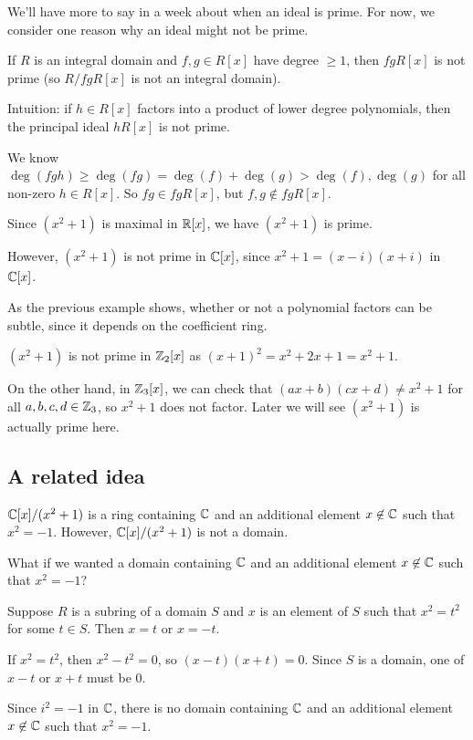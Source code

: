 \documentclass[12pt,letterpaper]{report}
\begin{document}
We'll have more to say in a week about when an ideal is prime.
For now, we consider one reason why an ideal might not be prime.

\begin{lem}{}{}
  If $R$ is an integral domain and $f, g \in R[x]$ have degree $\geq 1$, then $fgR[x]$ is not prime
  (so $R/fgR[x]$ is not an integral domain).
\end{lem}

Intuition: if $h \in R[x]$ factors into a product of lower degree polynomials, then the principal
ideal $hR[x]$ is not prime.

\begin{thmproof}
  We know $\deg(fgh) \geq \deg(fg) = \deg(f) + \deg(g) > \deg(f), \deg(g)$ for all non-zero
  $h \in R[x]$.
  So $fg \in fgR[x]$, but $f, g \not\in fgR[x]$.
\end{thmproof}

\begin{ex}
  Since $(x^2 + 1)$ is maximal in $\mathbb{R}[x]$, we have $(x^2 + 1)$ is prime.

  However, $(x^2 + 1)$ is not prime in $\mathbb{C}[x]$, since $x^2 + 1 = (x - i)(x + i)$ in $\mathbb{C}[x]$.
\end{ex}

As the previous example shows, whether or not a polynomial factors can be subtle, since it depends
on the coefficient ring.

\begin{ex}
  $(x^2 + 1)$ is not prime in $\mathbb{Z}_2[x]$ as $(x + 1)^2 = x^2 + 2x + 1 = x^2 + 1$.

  On the other hand, in $\mathbb{Z}_3[x]$, we can check that $(ax + b)(cx + d) \neq x^2 + 1$ for all
  $a, b, c, d \in \mathbb{Z}_3$, so $x^2 + 1$ does not factor.
  Later we will see $(x^2 + 1)$ is actually prime here.
\end{ex}

\pagebreak
\subsection{A related idea}

$\mathbb{C}[x]/(x^2 + 1)$ is a ring containing $\mathbb{C}$ and an additional element $x \not\in \mathbb{C}$ such that
$x^2 = -1$.
However, $\mathbb{C}[x]/(x^2 + 1)$ is not a domain.

What if we wanted a domain containing $\mathbb{C}$ and an additional element $x \not\in \mathbb{C}$ such that
$x^2 = -1$?

\begin{prop}{}{}
  Suppose $R$ is a subring of a domain $S$ and $x$ is an element of $S$ such that $x^2 = t^2$ for
  some $t \in S$.
  Then $x = t$ or $x = -t$.
\end{prop}

\begin{thmproof}
  If $x^2 = t^2$, then $x^2 - t^2 = 0$, so $(x - t)(x + t) = 0$.
  Since $S$ is a domain, one of $x - t$ or $x + t$ must be 0.
\end{thmproof}

Since $i^2 = -1$ in $\mathbb{C}$, there is no domain containing $\mathbb{C}$ and an additional element
$x \not\in \mathbb{C}$ such that $x^2 = -1$.

\end{document}

